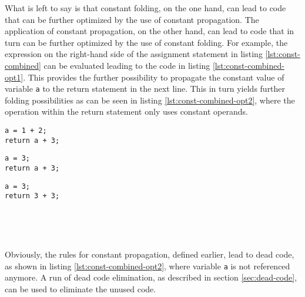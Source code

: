What is left to say is that constant folding, on the one hand, can lead to code that can be further optimized by the use of constant propagation. The application of constant propagation, on the other hand, can lead to code that in turn can be further optimized by the use of constant folding. For example, the expression on the right-hand side of the assignment statement in listing \ref{lst:const-combined} can be evaluated leading to the code in listing \ref{lst:const-combined-opt1}. This provides the further possibility to propagate the constant value of variable \lstinline!a! to the return statement in the next line. This in turn yields further folding possibilities as can be seen in listing \ref{lst:const-combined-opt2}, where the operation within the return statement only uses constant operands.

\newsavebox{\lstConstCombined}
\begin{lrbox}{\lstConstCombined}
\begin{lstlisting}[label=lst:const-combined]
a = 1 + 2;
return a + 3;
\end{lstlisting}
\end{lrbox}

\newsavebox{\lstConstCombinedFirstOpt}
\begin{lrbox}{\lstConstCombinedFirstOpt}
\begin{lstlisting}[label=lst:const-combined-opt1]
a = 3;
return a + 3;
\end{lstlisting}
\end{lrbox}

\newsavebox{\lstConstCombinedSecondOpt}
\begin{lrbox}{\lstConstCombinedSecondOpt}
\begin{lstlisting}[label=lst:const-combined-opt2]
a = 3;
return 3 + 3;
\end{lstlisting}
\end{lrbox}

\begin{minipage}[b]{0.33\textwidth}
\centerline{\usebox{\lstConstCombined}}
\end{minipage}
~
\begin{minipage}[t]{0.34\textwidth}
\centerline{\usebox{\lstConstCombinedFirstOpt}}
\end{minipage}
~
\begin{minipage}[t]{0.33\textwidth}
\centerline{\usebox{\lstConstCombinedSecondOpt}}
\end{minipage}

Obviously, the rules for constant propagation, defined earlier, lead to dead code, as shown in listing \ref{lst:const-combined-opt2}, where variable \lstinline!a! is not referenced anymore. A run of dead code elimination, as described in section \ref{sec:dead-code}, can be used to eliminate the unused code.

